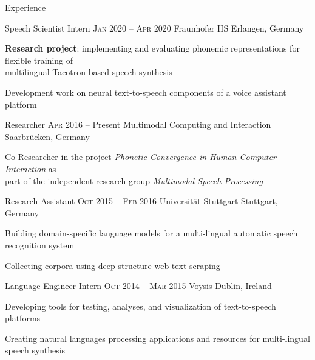 \documentclass{resume} %
\begin{document}
\begin{rSection}{Experience}

\begin{rSubsection}
	{Speech Scientist Intern}
	{\textsc{Jan} 2020 -- \textsc{Apr} 2020}
	{Fraunhofer IIS}
	{Erlangen, Germany}
	
	\setlength{\itemindent}{.7cm}
	
	\item \textbf{Research project}: implementing and evaluating phonemic representations for flexible training of\\\hspace*{.6cm} multilingual Tacotron-based speech synthesis
	\item Development work on neural text-to-speech components of a voice assistant platform
\end{rSubsection}

\begin{rSubsection}
	{Researcher}
	{\textsc{Apr} 2016 -- Present}
	{Multimodal Computing and Interaction}
	{Saarbrücken, Germany}
	
	\setlength{\itemindent}{.7cm}
	
	\item Co-Researcher in the project \textit{Phonetic Convergence in Human-Computer Interaction} as\\\hspace*{.7cm}part of the independent research group \textit{Multimodal Speech Processing}
\end{rSubsection}

\begin{rSubsection}
	{Research Assistant}
	{\textsc{Oct} 2015 -- \textsc{Feb} 2016}
	{Universität Stuttgart}
	{Stuttgart, Germany}
	
	\setlength{\itemindent}{.7cm}
	
	\item Building domain-specific language models for a multi-lingual automatic speech recognition system
	\item Collecting corpora using deep-structure web text scraping
\end{rSubsection}

\begin{rSubsection}
	{Language Engineer Intern}
	{\textsc{Oct} 2014 -- \textsc{Mar} 2015}
	{Voysis}
	{Dublin, Ireland}
	
	\setlength{\itemindent}{.7cm}

	\item Developing tools for testing, analyses, and visualization of text-to-speech platforms
	\item Creating natural languages processing applications and resources for multi-lingual speech synthesis
\end{rSubsection}


\end{rSection}
\end{document}
